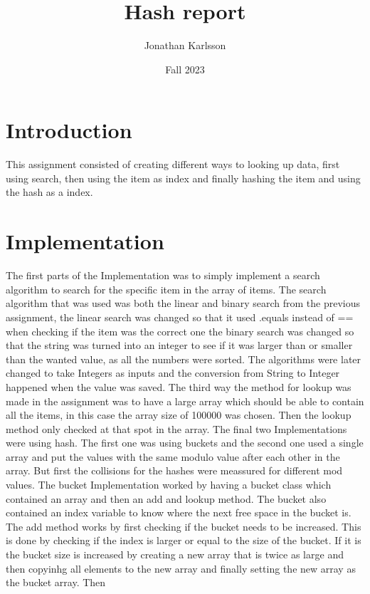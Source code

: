 \documentclass[a4paper,11pt]{article}
\begin{document}
\title{
    \textbf{Hash report}
}
\author{Jonathan Karlsson}
\date{Fall 2023}

\maketitle

\section*{Introduction}
This assignment consisted of creating different ways to looking up data, first using search, then using the item as index and finally hashing the item and using the hash as a index.


\section*{Implementation}
The first parts of the Implementation was to simply implement a search algorithm to search for the specific item in the array of items. The search algorithm that was used was both the linear and binary search from the previous assignment, the linear search was changed so that it used .equals instead of == when checking if the item was the correct one 
the binary search was changed so that the string was turned into an integer to see if it was larger than or smaller than the wanted value, as all the numbers were sorted. 
The algorithms were later changed to take Integers as inputs and the conversion from String to Integer happened when the value was saved. 
The third way the method for lookup was made in the assignment was to have a large array which should be able to contain all the items, in this case the array size of 100000 was chosen. Then the lookup method only checked at that spot in the array.
The final two Implementations were using hash. The first one was using buckets and the second one used a single array and put the values with the same modulo value after each other in the array. But first the collisions for the hashes were meassured for different mod values. 
The bucket Implementation worked by having a bucket class which contained an array and then an add and lookup method. The bucket also contained an index variable to know where the next free space in the bucket is. 
The add method works by first checking if the bucket needs to be increased. This is done by checking if the index is larger or equal to the size of the bucket. If it is the bucket size is increased by creating a new array that is twice as large and then copyinhg all elements to the new array and finally setting the new array as the bucket array. Then 
\end{document}
